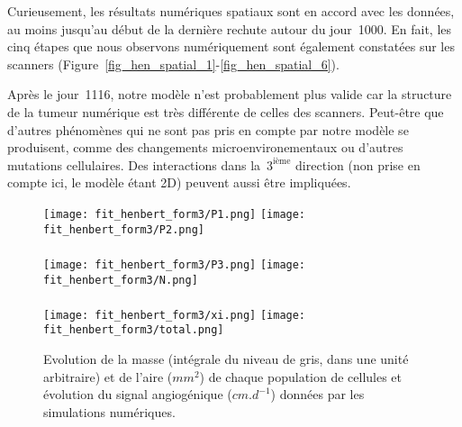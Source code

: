 \documentclass[main.tex]{subfiles}
\begin{document}
Curieusement, les résultats numériques spatiaux sont en accord avec les données, au moins jusqu'au début de la dernière rechute autour du jour~1000. En fait, les cinq étapes que nous observons numériquement sont également constatées sur les scanners (\cf Figure~\ref{fig_hen_spatial_1}-\ref{fig_hen_spatial_6}).


Après le jour~1116, notre modèle n'est probablement plus valide car la structure de la tumeur numérique est très différente de celles des scanners. Peut-être que d'autres phénomènes qui ne sont pas pris en compte par notre modèle se produisent, comme des changements microenvironementaux ou d'autres mutations cellulaires. Des interactions dans la~$3^\textrm{ième}$ direction (non prise en compte ici, le modèle étant 2D) peuvent aussi être impliquées.


\begin{figure}[p]
\texttt{[image: fit\_henbert\_form3/P1.png]} \qquad
\texttt{[image: fit\_henbert\_form3/P2.png]} \\ \\
\texttt{[image: fit\_henbert\_form3/P3.png]} \qquad
\texttt{[image: fit\_henbert\_form3/N.png]} \\ \\
\texttt{[image: fit\_henbert\_form3/xi.png]} \qquad
\texttt{[image: fit\_henbert\_form3/total.png]}
\caption{Evolution de la masse (intégrale du niveau de gris, dans une unité arbitraire) et de l'aire ($mm^2$) de chaque population de cellules et évolution du signal angiogénique ($cm.d^{-1}$) données par les simulations numériques.} \label{fig:simu_henbert_mass_area}
\end{figure}
\end{document}
